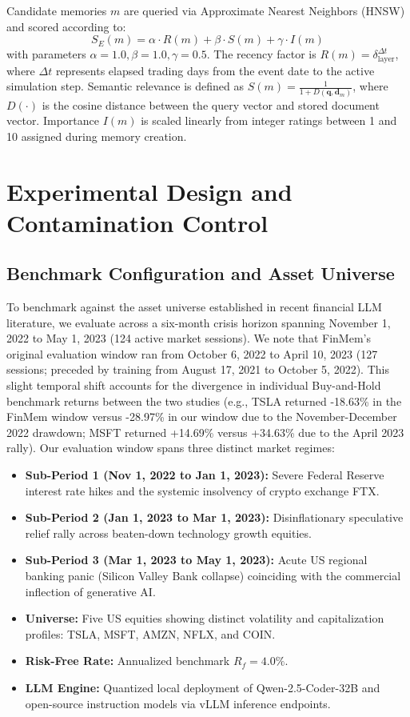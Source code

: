 \documentclass[conference]{IEEEtran}
\begin{document}
Candidate memories $m$ are queried via Approximate Nearest Neighbors (HNSW) and scored according to:
\begin{equation}
S_E(m) = \alpha \cdot R(m) + \beta \cdot S(m) + \gamma \cdot I(m)
\label{eq:memory_score}
\end{equation}
with parameters $\alpha = 1.0, \beta = 1.0, \gamma = 0.5$. The recency factor is $R(m) = \delta_{\text{layer}}^{\Delta t}$, where $\Delta t$ represents elapsed trading days from the event date to the active simulation step. Semantic relevance is defined as $S(m) = \frac{1}{1 + D(\mathbf{q}, \mathbf{d}_m)}$, where $D(\cdot)$ is the cosine distance between the query vector and stored document vector. Importance $I(m)$ is scaled linearly from integer ratings between 1 and 10 assigned during memory creation.

\section{Experimental Design and Contamination Control}

\subsection{Benchmark Configuration and Asset Universe}

To benchmark against the asset universe established in recent financial LLM literature, we evaluate across a six-month crisis horizon spanning November 1, 2022 to May 1, 2023 (124 active market sessions). We note that FinMem's original evaluation window \cite{yu2023finmem} ran from October 6, 2022 to April 10, 2023 (127 sessions; preceded by training from August 17, 2021 to October 5, 2022). This slight temporal shift accounts for the divergence in individual Buy-and-Hold benchmark returns between the two studies (e.g., TSLA returned -18.63\% in the FinMem window versus -28.97\% in our window due to the November-December 2022 drawdown; MSFT returned +14.69\% versus +34.63\% due to the April 2023 rally). Our evaluation window spans three distinct market regimes:
\begin{itemize}
    \item \textbf{Sub-Period 1 (Nov 1, 2022 to Jan 1, 2023):} Severe Federal Reserve interest rate hikes and the systemic insolvency of crypto exchange FTX.
    \item \textbf{Sub-Period 2 (Jan 1, 2023 to Mar 1, 2023):} Disinflationary speculative relief rally across beaten-down technology growth equities.
    \item \textbf{Sub-Period 3 (Mar 1, 2023 to May 1, 2023):} Acute US regional banking panic (Silicon Valley Bank collapse) coinciding with the commercial inflection of generative AI.
    \item \textbf{Universe:} Five US equities showing distinct volatility and capitalization profiles: TSLA, MSFT, AMZN, NFLX, and COIN.
    \item \textbf{Risk-Free Rate:} Annualized benchmark $R_f = 4.0\%$.
    \item \textbf{LLM Engine:} Quantized local deployment of Qwen-2.5-Coder-32B and open-source instruction models via vLLM inference endpoints.
\end{itemize}
\end{document}
